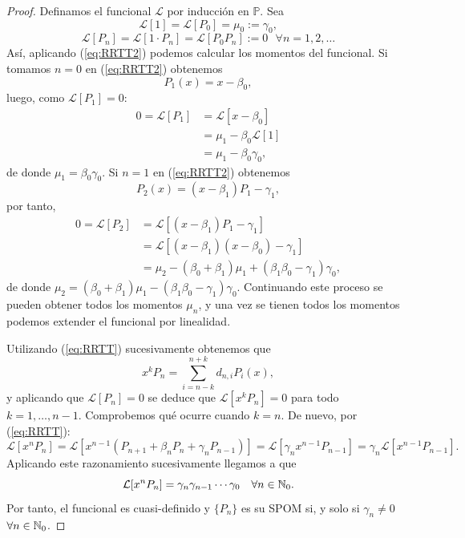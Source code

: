 \begin{proof}
    Definamos el funcional $\mathcal{L}$ por inducción en $\mathbb{P}$. Sea 
    $$
    \mathcal{L}[1]=\mathcal{L}[P_0] = \mu_0 := \gamma_0,
    $$ $$
    \mathcal{L}[P_n] = \mathcal{L}[1 \cdot P_n] = \mathcal{L}[P_0 P_n] := 0 \ \ \ \forall n = 1,2,\dots 
    $$
    Así, aplicando (\ref{eq:RRTT2}) podemos calcular los momentos del funcional.
    Si tomamos $n=0$ en (\ref{eq:RRTT2}) obtenemos 
    $$
    P_1(x) = x-\beta_0, 
    $$
    luego, como $\mathcal{L}[P_1]=0$:
    \begin{equation*}
        \begin{split}
            0 = \mathcal{L}[P_1] &= \mathcal{L}[x-\beta_0] \\
            &= \mu_1 - \beta_0 \mathcal{L}[1] \\
            &= \mu_1 -\beta_0 \gamma_0,
        \end{split}
    \end{equation*}
    de donde $\mu_1 = \beta_0 \gamma_0$. Si $n=1$ en (\ref{eq:RRTT2}) obtenemos 
    $$
    P_2(x) = (x-\beta_1)P_1 - \gamma_1,
    $$
    por tanto,
    \begin{equation*}
        \begin{split}
            0 = \mathcal{L}[P_2] &= \mathcal{L}[(x-\beta_1)P_1 - \gamma_1] \\
            &= \mathcal{L}[(x-\beta_1)(x-\beta_0) - \gamma_1] \\
            &= \mu_2 - (\beta_0 + \beta_1)\mu_1 + (\beta_1\beta_0 -\gamma_1)\gamma_0,
        \end{split}
    \end{equation*}
    de donde $\mu_2 = (\beta_0 + \beta_1)\mu_1 - (\beta_1\beta_0 -\gamma_1)\gamma_0$. Continuando este proceso se pueden obtener todos los momentos $\mu_n$, y una vez se tienen todos los momentos podemos extender el funcional por linealidad.

    Utilizando (\ref{eq:RRTT}) sucesivamente obtenemos que
    $$
    x^k P_n = \sum_{i=n-k}^{n+k} d_{n,i} P_i(x),
    $$
    y aplicando que $\mathcal{L}[P_n]=0$ se deduce que $\mathcal{L}[x^k P_n] = 0$ para todo $k=1,\dots, n-1$. Comprobemos qué ocurre cuando $k=n$. De nuevo, por (\ref{eq:RRTT}):
    $$
    \mathcal{L}[x^n P_n] = \mathcal{L}[x^{n-1}(P_{n+1} + \beta_n P_n + \gamma_n P_{n-1})] = \mathcal{L}[\gamma_n x^{n-1} P_{n-1}] = \gamma_n \mathcal{L}[x^{n-1} P_{n-1}].
    $$
    Aplicando este razonamiento sucesivamente llegamos a que 
    \begin{equation}
        \label{eq:LxnPn}
        \mathcal{L}[x^n P_n] = \gamma_n\gamma_{n-1}\cdots\gamma_0 \ \ \ \forall n \in\N_0.
    \end{equation}
    Por tanto, el funcional es cuasi-definido y $\{P_n\}$ es su SPOM si, y solo si $\gamma_n\neq 0$ $\forall n\in\mathbb{N}_0$.
    

\end{proof}
